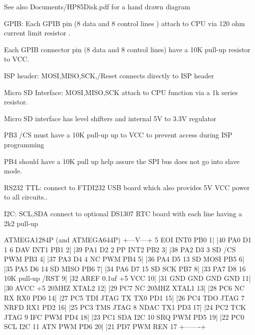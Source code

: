 {\bfseries 
\begin{DoxyItemize}
\item \begin{DoxySeeAlso}{See also}
Documents/\+H\+P85\+Disk.\+pdf for a hand drawn diagram
\end{DoxySeeAlso}

\item G\+P\+IB\+: Each G\+P\+IB pin (8 data and 8 control lines ) attach to C\+PU via 120 ohm current limit resistor .
\begin{DoxyItemize}
\item Each G\+P\+IB connector pin (8 data and 8 control lines) have a 10K pull-\/up resistor to V\+CC.
\end{DoxyItemize}
\item I\+SP header\+: M\+O\+SI,M\+I\+SO,S\+CK,/\+Reset connects directly to I\+SP header
\item Micro SD Interface\+: M\+O\+SI,M\+I\+SO,S\+CK attach to C\+PU function via a 1k series resistor.
\begin{DoxyItemize}
\item Micro SD interface has level shifters and internal 5V to 3.\+3V regulator
\item P\+B3 /\+CS must have a 10K pull-\/up up to V\+CC to prevent access during I\+SP programming
\item P\+B4 should have a 10K pull up help assure the S\+PI bus does not go into slave mode.
\end{DoxyItemize}
\item R\+S232 T\+TL\+: connect to F\+T\+D\+I232 U\+SB board which also provides 5V V\+CC power to all circuits..
\item I2C\+: S\+CL,S\+DA connect to optional D\+S1307 R\+TC board with each line having a 2k2 pull-\/up 
\begin{DoxyPre}\end{DoxyPre}



\begin{DoxyPre}                       ATMEGA1284P (and ATMEGA644P) 
                       +---V---+ 
     5 EOI INT0  PB0  1|       |40  PA0      D1  1 
     6 DAV INT1  PB1  2|       |39  PA1      D2  2 
       PP  INT2  PB2  3|       |38  PA2      D3  3 
    SD /CS  PWM  PB3  4|       |37  PA3      D4  4 
       NC   PWM  PB4  5|       |36  PA4      D5 13 
    SD     MOSI  PB5  6|       |35  PA5      D6 14 
    SD     MISO  PB6  7|       |34  PA6      D7 15 
    SD      SCK  PB7  8|       |33  PA7      D8 16 
    10K pull-up  /RST  9|       |32  AREF     0.1uf 
       +5        VCC 10|       |31  GND      GND   
       GND       GND 11|       |30  AVCC     +5    
    20MHZ      XTAL2 12|       |29  PC7      NC    
    20MHZ      XTAL1 13|       |28  PC6      NC    
       RX   RX0  PD0 14|       |27  PC5  TDI JTAG 
       TX   TX0  PD1 15|       |26  PC4  TDO JTAG 
     7 NRFD RX1  PD2 16|       |25  PC3  TMS JTAG 
     8 NDAC TX1  PD3 17|       |24  PC2  TCK JTAG 
     9 IFC  PWM  PD4 18|       |23  PC1  SDA I2C   
    10 SRQ  PWM  PD5 19|       |22  PC0  SCL I2C  
    11 ATN  PWM  PD6 20|       |21  PD7  PWM REN 17 
                       +-------+ 
\end{DoxyPre}


\end{DoxyItemize}}
